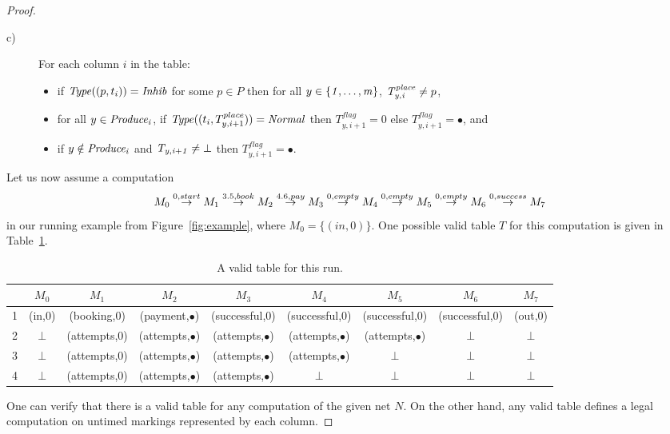 \begin{proof}
\begin{definition}
\begin{description}
\item[c)] For each column $i$ in the table:
\begin{itemize}
\item if $\mathit{Type}((p,t_i))=\mathit{Inhib}$ for some $p \in P$ 
then for all $y \in {\mathit{\{1,\ldots,m\}}}$, ${\mathit{T^{\mathit{place}}_{y,i}}}\neq p$,
\item for all $y \in {\mathit{Produce_i}}$, if
${\mathit {\mathit{Type}}((t_i,T^{place}_{y,i+1}))=\mathit{Normal}}$ 
then ${\mathit T^{flag}_{y,i+1}=0}$ else ${\mathit T^{flag}_{y,i+1}=\bullet}$,
and
\item if $y \notin {\mathit{Produce_i}}$ and ${\mathit{T_{y,i+1}}} \neq \bot$ then ${\mathit T^{flag}_{y,i+1}=\bullet}$.
\end{itemize}
\end{description}
\end{definition}
Let us now assume a  computation 
$$M_0 \stackrel{0,start}{\rightarrow} M_1 \stackrel{3.5,book}{\rightarrow} M_2 \stackrel{4.6,pay}{\rightarrow}  
M_3 \stackrel{0,empty}{\rightarrow} M_4 \stackrel{0,empty}{\rightarrow}  M_5 \stackrel{0,empty}{\rightarrow} 
M_6 \stackrel{0,success}{\rightarrow}M_7$$ 
in our running example from Figure~\ref{fig:example}, where $M_0=\{(in,0)\}$.
One possible valid table $T$ for this computation is given
in Table~\ref{validtable}.

\begin{table}
\scriptsize
\begin{tabular}{|c|c|c|c|c|c|c|c|c|}
 \hline
 & $M_0$ & $M_1$ & $M_2$ & $M_3$ & $M_4$ & $M_5$ & $M_6$ & $M_7$\\
\hline
1 & (in,0) & (booking,0)   & (payment,$\bullet$) & (successful,0) & (successful,0) & (successful,0) & (successful,0) & (out,0)\\\hline
2 & $\bot$   & (attempts,0) & (attempts,$\bullet$) & (attempts,$\bullet$) & (attempts,$\bullet$) & (attempts,$\bullet$) & $\bot$ & $\bot$\\\hline
3 & $\bot$   & (attempts,0) & (attempts,$\bullet$) & (attempts,$\bullet$) & (attempts,$\bullet$) & $\bot$ & $\bot$ & $\bot$\\\hline
4 & $\bot$   & (attempts,0) & (attempts,$\bullet$) & (attempts,$\bullet$) & $\bot$ & $\bot$ & $\bot$ & $\bot$\\
\hline
\end{tabular}
\vspace{3mm}
\caption{A valid table for this run.}
\vspace{-3mm}
\label{validtable}
\end{table}

One can verify that there is a valid table for any computation of the
given net $N$. On the other hand, any valid table defines a legal computation 
on untimed markings represented by each column.


\end{proof}
